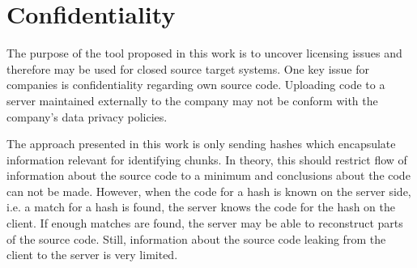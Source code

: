 \section{Confidentiality}
The purpose of the tool proposed in this work is to uncover licensing issues and therefore may be used for closed source target systems.
One key issue for companies is confidentiality regarding own source code.
Uploading code to a server maintained externally to the company may not be conform with the company's data privacy policies.

The approach presented in this work is only sending hashes which encapsulate information relevant for identifying chunks.
In theory, this should restrict flow of information about the source code to a minimum and conclusions about the code can not be made.
However, when the code for a hash is known on the server side, i.e. a match for a hash is found, the server knows the code for the hash on the client.
If enough matches are found, the server may be able to reconstruct parts of the source code.
Still, information about the source code leaking from the client to the server is very limited.
